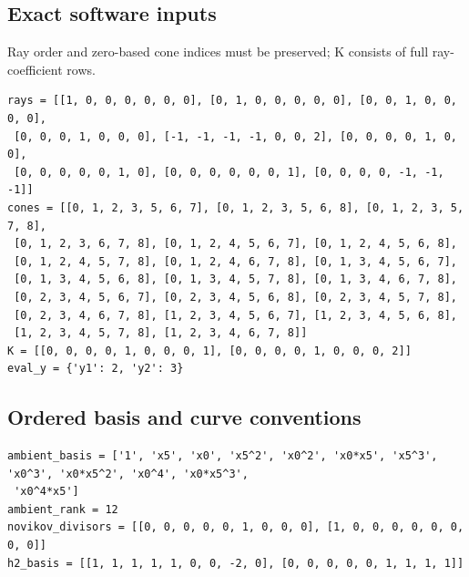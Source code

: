 \documentclass[10pt,a4paper]{article}
\begin{document}
\subsection*{Exact software inputs}
Ray order and zero-based cone indices must be preserved; K consists of full ray-coefficient rows.
\begin{lstlisting}
rays = [[1, 0, 0, 0, 0, 0, 0], [0, 1, 0, 0, 0, 0, 0], [0, 0, 1, 0, 0, 0, 0],
 [0, 0, 0, 1, 0, 0, 0], [-1, -1, -1, -1, 0, 0, 2], [0, 0, 0, 0, 1, 0, 0],
 [0, 0, 0, 0, 0, 1, 0], [0, 0, 0, 0, 0, 0, 1], [0, 0, 0, 0, -1, -1, -1]]
cones = [[0, 1, 2, 3, 5, 6, 7], [0, 1, 2, 3, 5, 6, 8], [0, 1, 2, 3, 5, 7, 8],
 [0, 1, 2, 3, 6, 7, 8], [0, 1, 2, 4, 5, 6, 7], [0, 1, 2, 4, 5, 6, 8],
 [0, 1, 2, 4, 5, 7, 8], [0, 1, 2, 4, 6, 7, 8], [0, 1, 3, 4, 5, 6, 7],
 [0, 1, 3, 4, 5, 6, 8], [0, 1, 3, 4, 5, 7, 8], [0, 1, 3, 4, 6, 7, 8],
 [0, 2, 3, 4, 5, 6, 7], [0, 2, 3, 4, 5, 6, 8], [0, 2, 3, 4, 5, 7, 8],
 [0, 2, 3, 4, 6, 7, 8], [1, 2, 3, 4, 5, 6, 7], [1, 2, 3, 4, 5, 6, 8],
 [1, 2, 3, 4, 5, 7, 8], [1, 2, 3, 4, 6, 7, 8]]
K = [[0, 0, 0, 0, 1, 0, 0, 0, 1], [0, 0, 0, 0, 1, 0, 0, 0, 2]]
eval_y = {'y1': 2, 'y2': 3}
\end{lstlisting}
\subsection*{Ordered basis and curve conventions}
\begin{lstlisting}
ambient_basis = ['1', 'x5', 'x0', 'x5^2', 'x0^2', 'x0*x5', 'x5^3', 'x0^3', 'x0*x5^2', 'x0^4', 'x0*x5^3',
 'x0^4*x5']
ambient_rank = 12
novikov_divisors = [[0, 0, 0, 0, 0, 1, 0, 0, 0], [1, 0, 0, 0, 0, 0, 0, 0, 0]]
h2_basis = [[1, 1, 1, 1, 1, 0, 0, -2, 0], [0, 0, 0, 0, 0, 1, 1, 1, 1]]
\end{lstlisting}
\end{document}
